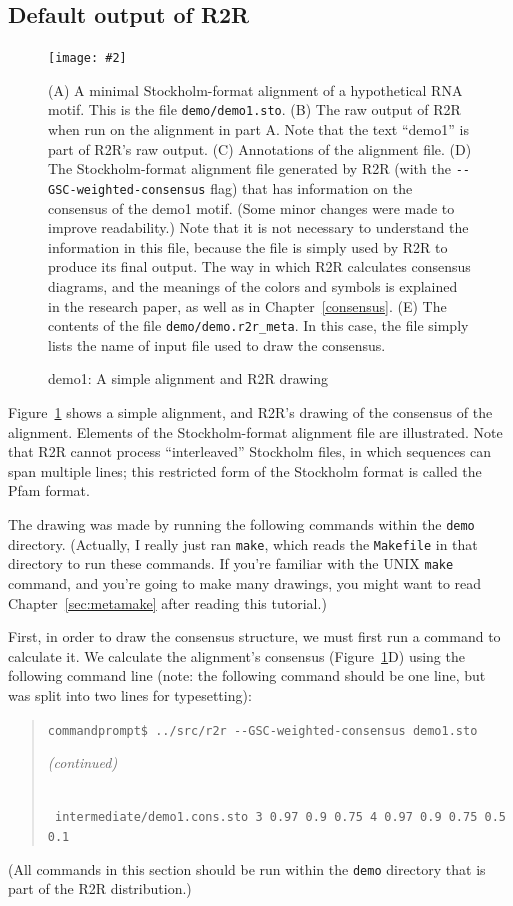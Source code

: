 \documentclass[letterpaper,12pt]{report}
\newcommand{\fig}[4]{
\begin{figure}
\texttt{[image: \#2]}
\caption{#3}

\begin{small}
#4
\end{small}
\label{#1}
\end{figure}
}
\newcommand{\example}[1]{
\begin{quote}
{\raggedright
#1
}
\end{quote}
}
\begin{document}
\subsection{Default output of R2R}
\fig{fig:demo1}{figures/demo1.pdf}{demo1: A simple alignment and R2R drawing}{
(A)
A minimal Stockholm-format alignment of a hypothetical RNA motif.
This is the file {\tt demo/demo1.sto}.
(B)
The raw output of R2R when run on the alignment in part A.
Note that the text ``demo1'' is part of R2R's raw output.
(C)
Annotations of the alignment file.
(D)
The Stockholm-format alignment file generated by R2R
(with the {\tt -{}-GSC-weighted-consensus} flag)
 that has information on the consensus
of the demo1 motif.
(Some minor changes were made to improve readability.)
Note that it is not necessary to understand the information in this file, because the file is simply used by R2R to produce its final output.
The way in which R2R calculates consensus diagrams, and the meanings of the colors and symbols is explained in the research paper, as well as in Chapter~\ref{consensus}.
(E)
The contents of the file {\tt demo/demo.r2r\_meta}.  In this case, the file simply lists the name of input
file used to draw the consensus.
}
Figure~\ref{fig:demo1} shows a simple alignment, and R2R's drawing of the consensus of the alignment.  
Elements of the Stockholm-format alignment file are illustrated.  Note that R2R cannot process ``interleaved'' Stockholm files, in which sequences can span multiple lines; this restricted form of the Stockholm format is called the Pfam format.

The drawing was made by running the following commands within the {\tt demo} directory.  (Actually,
I really just ran {\tt make}, which reads the {\tt Makefile} in that directory to run these commands.
If you're familiar with the UNIX {\tt make} command, and you're going to make many drawings, you might want
to read Chapter~\ref{sec:metamake} after reading this tutorial.)

First, in order to draw the consensus structure, we must first run a command
to calculate it.
We calculate the alignment's consensus (Figure~\ref{fig:demo1}D) using the following command line (note: the following command should be one line, but was split into two lines for typesetting):

\example{
{\tt commandprompt\$ ../src/r2r -{}-GSC-weighted-consensus demo1.sto}\hfill\begin{small}{\it (continued)}\end{small}\\
{\tt\hspace{0.3in} intermediate/demo1.cons.sto 3 0.97 0.9 0.75 4 0.97 0.9 0.75 0.5 0.1}
}
(All commands in this section should be run within the {\tt demo} directory that is part of the
R2R distribution.)
\end{document}
